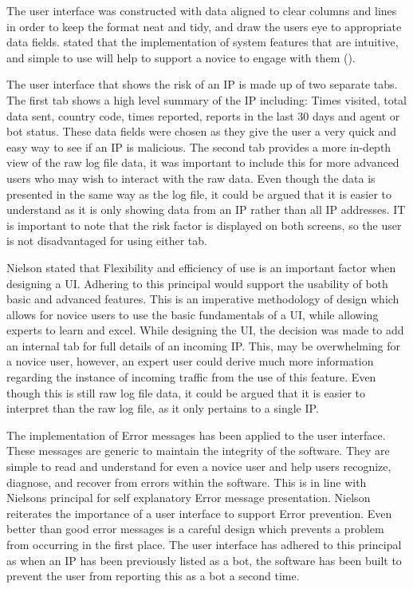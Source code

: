 The user interface was constructed with data aligned to clear columns and lines in order to keep the format neat and tidy, and draw the users eye to appropriate data fields. \citeauthor{cranor2008framework} stated that the implementation of system features that are intuitive, and simple to use will help to support a novice to engage with them (\cite{cranor2008framework}).

The user interface that shows the risk of an IP is made up of two separate tabs. The first tab shows a high level summary of the IP including: Times visited, total data sent, country code, times reported, reports in the last 30 days and agent or bot status. These data fields were chosen as they give the user a very quick and easy way to see if an IP is malicious. The second tab provides a more in-depth view of the raw log file data, it was important to include this for more advanced users who may wish to interact with the raw data. Even though the data is presented in the same way as the log file, it could be argued that it is easier to understand as it is only showing data from an IP rather than all IP addresses. IT is important to note that the risk factor is displayed on both screens, so the user is not disadvantaged for using either tab.

Nielson stated that Flexibility and efficiency of use is an important factor when designing a UI. Adhering to this principal would support the usability of both basic and advanced features. This is an imperative methodology of design which allows for novice users to use the basic fundamentals of a UI, while allowing experts to learn and excel. While designing the UI, the decision was made to add an internal tab for full details of an incoming IP. This, may be overwhelming for a novice user, however, an expert user could derive much more information regarding the instance of incoming traffic from the use of this feature. Even though this is still raw log file data, it could be argued that it is easier to interpret than the raw log file, as it only pertains to a single IP.


The implementation of Error messages has been applied to the user interface. These messages are generic to maintain the integrity of the software. They are simple to read and understand for even a novice user and help users recognize, diagnose, and recover from errors within the software. This is in line with Nielsons principal for self explanatory Error message presentation. Nielson reiterates the importance of a user interface to support Error prevention. Even better than good error messages is a careful design which prevents a problem from occurring in the first place. The user interface has adhered to this principal as when an IP has been previously listed as a bot, the software has been built to prevent the user from reporting this as a bot a second time.

